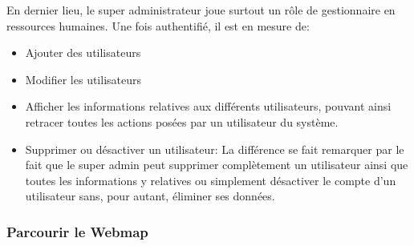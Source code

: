 En dernier lieu, le super administrateur joue surtout un rôle de gestionnaire en ressources 
humaines. Une fois authentifié, il est en mesure de:
\begin{itemize}
    \item Ajouter des utilisateurs
    \item Modifier les utilisateurs
    \item Afficher les informations relatives aux différents utilisateurs, pouvant 
    ainsi retracer toutes les actions posées par un utilisateur du système.
    \item Supprimer ou désactiver un utilisateur: La différence se fait remarquer 
    par le fait que le super admin peut supprimer complètement un utilisateur ainsi 
    que toutes les informations y relatives ou simplement désactiver le compte d'un 
    utilisateur sans, pour autant, éliminer ses données.
\end{itemize}

\subsubsection{Parcourir le Webmap}
